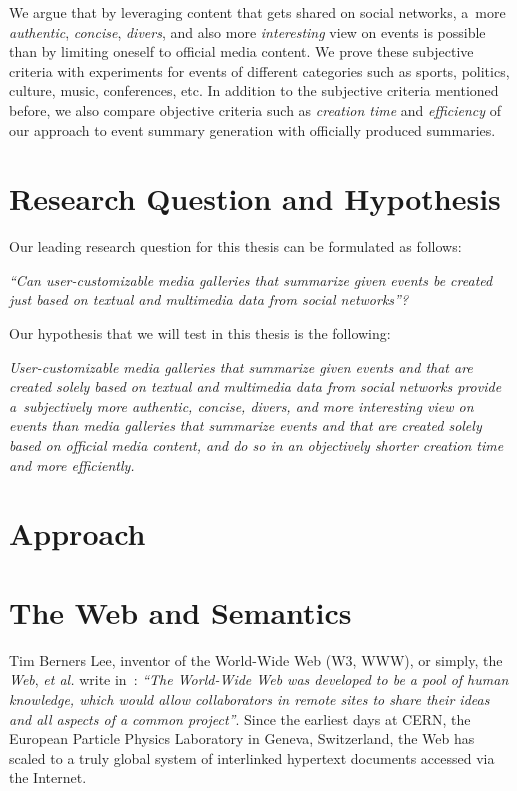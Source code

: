 We argue that by leveraging content that gets shared on social networks,
a~more \emph{authentic}, \emph{concise}, \emph{divers}, and also more \emph{interesting}
view on events is possible than by limiting oneself to official media content.
We prove these subjective criteria with experiments for events of different categories
such as sports, politics, culture, music, conferences, etc.
In addition to the subjective criteria mentioned before,
we also compare objective criteria such as \emph{creation time} and \emph{efficiency}
of our approach to event summary generation with officially produced summaries.

\section{Research Question and Hypothesis}
Our leading research question for this thesis can be formulated as follows:
 
\textit{``Can user-customizable media galleries that summarize given events
be created just based on textual and multimedia data from social networks''?}

\noindent Our hypothesis that we will test in this thesis is the following:

\textit{User-customizable media galleries that summarize given events and
that are created solely based on textual and multimedia data from social networks
provide a~subjectively more \emph{authentic}, \emph{concise}, \emph{divers},
and more \emph{interesting} view on events than media galleries that summarize events
and that are created solely based on official media content,
and do so in an objectively \emph{shorter} creation time and more \emph{efficiently}.}

\section{Approach}

\section{The Web and Semantics}
Tim Berners Lee, inventor of the World-Wide Web (W3, WWW), or simply, the \emph{Web}, \emph{et al.}
write in~\cite{BernersLee1994}: \textit{``The World-Wide Web was developed
to be a pool of human knowledge, which would allow collaborators
in remote sites to share their ideas
and all aspects of a common project''}.
Since the earliest days at CERN,
the European Particle Physics Laboratory in Geneva, Switzerland,
the Web has scaled to a truly global system of interlinked hypertext documents
accessed via the Internet.

